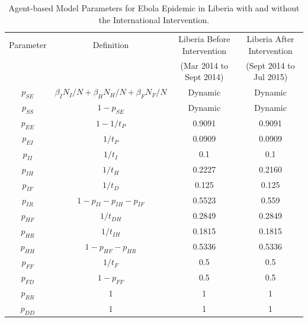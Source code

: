\begin{table}[h!]
\centering %
\begin{tabular}{c c c c} 
\hline\hline %
Parameter & Definition&  Liberia Before Intervention  & Liberia After Intervention \\ %
& & (Mar 2014 to Sept 2014) &  (Sept 2014 to Jul 2015) \\ %
\hline %
$p_{SE}$	 &$\beta_I N_{I}/N+\beta_H N_{H}/N+\beta_F  N_F/ N$ 	& Dynamic	 & Dynamic \\ 
$p_{SS}$ 	& $1-p_{SE}$													 & Dynamic & Dynamic  \\ 
$p_{EE}$ 	& $1-1/t_{P}$ 												& 0.9091 			& 0.9091  \\ 
$p_{EI}$ 	& $1/t_{P}$ 												&0.0909			 & 0.0909  \\ 
$p_{II}$ 	& $1/t_{I}$ 												& 0.1 				& 0.1  \\ 
$p_{IH}$	 & $1/t_{H}$ 												&0.2227 			& 0.2160  \\ 
$p_{IF}$ 	& $1/t_{D}$ 												& 0.125 			& 0.125  \\ 
$p_{IR}$ 	& $1-p_{II}-p_{IH}-p_{IF}$ 											&0.5523 			& 0.559  \\ 
$p_{HF}$ 	& $1/t_{DH}$												& 0.2849 			& 0.2849 \\ 
$p_{HR}$ 	& $1/t_{IH}$ 												&0.1815 			& 0.1815 \\ 
$p_{HH}$ 	& $1-p_{HF}-p_{HR}$ 												& 0.5336			& 0.5336  \\ 
$p_{FF}$ 	& $1/t_{F}$ 												&  0.5 			& 0.5 \\ 
$p_{FD}$ 	& $1-p_{FF}$													 & 0.5 			& 0.5  \\ 
$p_{RR}$ 	& 1															& 1 				& 1  \\ 
$p_{DD}$ 	& 1															&1				 & 1 \\ [1ex] 
\hline 
\end{tabular}
\caption{Agent-based Model Parameters for Ebola Epidemic in Liberia with and without the International Intervention.} 
\label{tab:probabilities}
\end{table}
